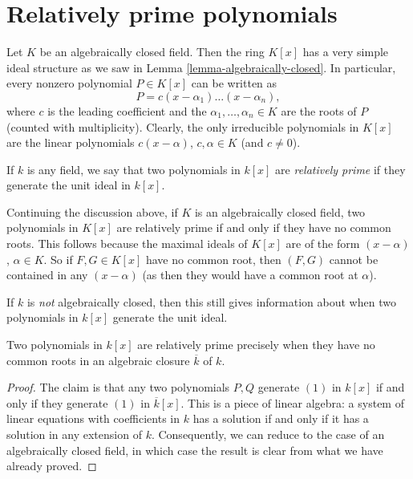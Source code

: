 \section{Relatively prime polynomials}
\label{section-relatively-prime}

\noindent
Let $K$ be an algebraically closed field. Then the ring $K[x]$ has a very
simple ideal structure as we saw in Lemma \ref{lemma-algebraically-closed}.
In particular, every nonzero polynomial $P \in K[x]$ can be written as
$$
P = c(x - \alpha_1) \ldots (x - \alpha_n),
$$
where $c$ is the leading coefficient and the $\alpha_1, \ldots, \alpha_n \in K$
are the roots of $P$ (counted with multiplicity). Clearly, the only irreducible
polynomials in $K[x]$ are the linear polynomials $c(x - \alpha)$,
$c, \alpha \in K$ (and $c \neq 0$).

\begin{definition}
\label{definition-relatively-prime}
If $k$ is any field, we say that two polynomials in $k[x]$ are
{\it relatively prime} if they generate the unit ideal in $k[x]$.
\end{definition}

\noindent
Continuing the discussion above, if $K$ is an algebraically closed field,
two polynomials in $K[x]$ are relatively prime if and only if they have no
common roots. This follows because the maximal ideals of $K[x]$ are of the form
$(x - \alpha)$, $\alpha \in K$. So if $F, G \in K[x]$ have no common root,
then $(F, G)$ cannot be contained in any $(x - \alpha)$ (as then they would
have a common root at $\alpha$).

\medskip\noindent
If $k$ is {\it not} algebraically closed, then this still gives
information about when two polynomials in $k[x]$ generate the unit ideal.

\begin{lemma}
\label{lemma-relatively-prime-polynomials}
Two polynomials in $k[x]$ are relatively prime precisely when they
have no common roots in an algebraic closure $\overline{k}$ of $k$.
\end{lemma}

\begin{proof}
The claim is that any two polynomials $P, Q$ generate $(1)$ in $k[x]$ if and
only if they generate $(1)$ in $\overline{k}[x]$. This is a piece of
linear algebra: a system of linear equations with coefficients in $k$ has
a solution if and only if it has a solution in any extension of $k$.
Consequently, we can reduce to the case of an algebraically closed field, in
which case the result is clear from what we have already proved.
\end{proof}






